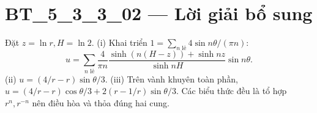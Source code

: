\documentclass[10pt,a4paper]{article}
\begin{document}
\section*{BT\_5\_3\_3\_02 — Lời giải bổ sung}
Đặt $z=\ln r,H=\ln2$. (i) Khai triển $1=\sum_{n\text{ lẻ}}4\sin n\theta/(\pi n)$:
\[u=\sum_{n\text{ lẻ}}\frac4{\pi n}\frac{\sinh(n(H-z))+\sinh nz}{\sinh nH}\sin n\theta.\]
(ii) $u=(4/r-r)\sin\theta/3$.
(iii) Trên vành khuyên toàn phần, $u=(4/r-r)\cos\theta/3+2(r-1/r)\sin\theta/3$. Các biểu thức đều là tổ hợp $r^n,r^{-n}$ nên điều hòa và thỏa đúng hai cung.
\end{document}
